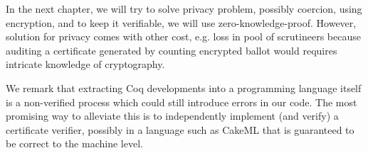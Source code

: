  In the next chapter, we will try to solve privacy problem, possibly coercion, using encryption, and to keep 
 it verifiable, we will use zero-knowledge-proof. However, solution for privacy comes with other cost, e.g. 
 loss in pool of scrutineers because auditing a certificate generated by counting encrypted ballot 
 would requires intricate knowledge of cryptography.  
 
We remark that extracting Coq developments into a
programming language itself is a non-verified process which could
still introduce errors in our code. The most promising way to
alleviate this is to independently implement (and verify) a
certificate verifier, possibly in a language such as CakeML
\citep{Kumar:2014:CVI} that is guaranteed to
be correct to the machine level. 
